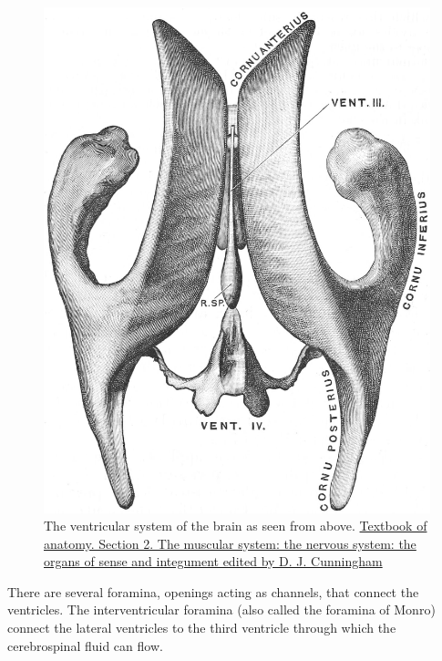 \begin{figure}

{\centering \includegraphics[width=0.7\linewidth]{./figures/cns/Ventricles} 

}

\caption{The ventricular system of the brain as seen from above. \href{https://wellcomelibrary.org/item/b21271070}{Textbook of anatomy. Section 2. The muscular system: the nervous system: the organs of sense and integument edited by D. J. Cunningham}}\label{fig:ventricles}
\end{figure}

There are several foramina, openings acting as channels, that connect the ventricles. The interventricular foramina (also called the foramina of Monro) connect the lateral ventricles to the third ventricle through which the cerebrospinal fluid can flow.

